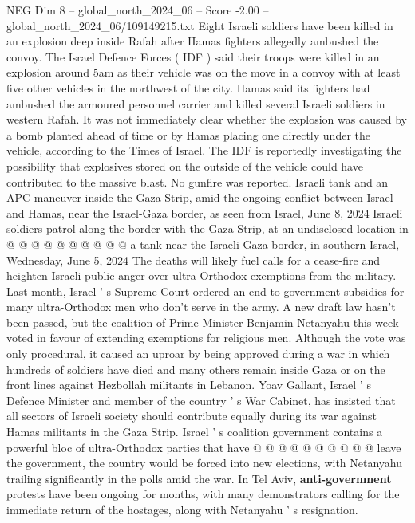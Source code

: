 \begin{textsample}{NEG Dim 8 – global\_north\_2024\_06 – Score -2.00 – global\_north\_2024\_06/109149215.txt}  \label{ex:f8_neg_189}
Eight Israeli soldiers have been killed in an explosion deep inside Rafah after Hamas fighters allegedly ambushed the convoy.
The Israel Defence Forces ( IDF ) said their troops were killed in an explosion around 5am as their vehicle was on the move in a convoy with at least five other vehicles in the northwest of the city.
Hamas said its fighters had ambushed the armoured personnel carrier and killed several Israeli soldiers in western Rafah.
It was not immediately clear whether the explosion was caused by a bomb planted ahead of time or by Hamas placing one directly under the vehicle, according to the Times of Israel.
The IDF is reportedly investigating the possibility that explosives stored on the outside of the vehicle could have contributed to the massive blast.
No gunfire was reported.
Israeli tank and an APC maneuver inside the Gaza Strip, amid the ongoing conflict between Israel and Hamas, near the Israel-Gaza border, as seen from Israel, June 8, 2024 Israeli soldiers patrol along the border with the Gaza Strip, at an undisclosed location in @ @ @ @ @ @ @ @ @ @ a tank near the Israeli-Gaza border, in southern Israel, Wednesday, June 5, 2024 The deaths will likely fuel calls for a cease-fire and heighten Israeli public anger over ultra-Orthodox exemptions from the military.
Last month, Israel ' s Supreme Court ordered an end to government subsidies for many ultra-Orthodox men who don't serve in the army.
A new draft law hasn't been passed, but the coalition of Prime Minister Benjamin Netanyahu this week voted in favour of extending exemptions for religious men.
Although the vote was only procedural, it caused an uproar by being approved during a war in which hundreds of soldiers have died and many others remain inside Gaza or on the front lines against Hezbollah militants in Lebanon.
Yoav Gallant, Israel ' s Defence Minister and member of the country ' s War Cabinet, has insisted that all sectors of Israeli society should contribute equally during its war against Hamas militants in the Gaza Strip.
Israel ' s coalition government contains a powerful bloc of ultra-Orthodox parties that have @ @ @ @ @ @ @ @ @ @ leave the government, the country would be forced into new elections, with Netanyahu trailing significantly in the polls amid the war.
In Tel Aviv, \textbf{anti-government} protests have been ongoing for months, with many demonstrators calling for the immediate return of the hostages, along with Netanyahu ' s resignation.

\end{textsample}
